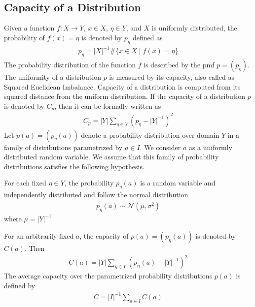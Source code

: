 \subsection{Capacity of a Distribution} \label{section:capacity_of_a_distribution}
Given a function $f:X \rightarrow Y$, $x \in X$, $\eta \in Y$, and $X$ is uniformly distributed, the probability of $f(x) =\eta$ is denoted by $p_{\eta}$ defined as 
\begin{eqnarray}
p_{\eta} = |X|^{-1}\#\lbrace x \in X \;|\; f(x) = \eta \rbrace \label{eqn:p_eta_a}
\end{eqnarray}  
The probability distribution of the function $f$ is described by the pmf $p = (p_{\eta})$. The uniformity of a distribution $p$ is measured by its capacity, also called as Squared Euclidean Imbalance. Capacity of a distribution is computed from its squared distance from the uniform distribution. If the capacity of a distribution $p$ is denoted by $C_p$, then it can be formally written as 
\begin{eqnarray}
C_{p} = |Y|\displaystyle\sum_{\eta \in Y}(p_{\eta} - |Y|^{-1})^2 \label{eqn:capacity_of_a_distribution}
\end{eqnarray}Let $p(a) = (p_{\eta}(a))$ denote a probability distribution over domain $Y$ in a family of distributions parametrized by $a \in I$. We consider $a$ as a uniformly distributed random variable. We assume that this family of probability distributions satisfies the following hypothesis. 
\begin{hyp}\label{hyp:hypothesis_on_p_eta_a}
For each fixed $\eta \in Y$, the probability $p_{\eta}(a)$ is a random variable and independently distributed and follow the normal distribution
\begin{eqnarray*}
p_{\eta}(a) \sim \mathcal{N}\left(\mu,\sigma^2\right) 
\end{eqnarray*}
where $\mu = |Y|^{-1}$
\end{hyp}For an arbitrarily fixed $a$, the capacity of $p(a) = \left(p_{\eta}\left(a\right)\right)$ is denoted by $C(a)$. Then
\begin{eqnarray}
C\left(a\right) = |Y|\displaystyle\sum_{\eta \in Y}(p_{n}\left(a\right) - |Y|^{-1})^2 \label{eqn:defn_c(a)}
\end{eqnarray}
The average capacity over the parametrized probability distributions $p(a)$ is defined by 
\begin{eqnarray}
C = |I|^{-1}\displaystyle\sum_{a \in I}C(a) \label{eqn:average of C a}
\end{eqnarray}
